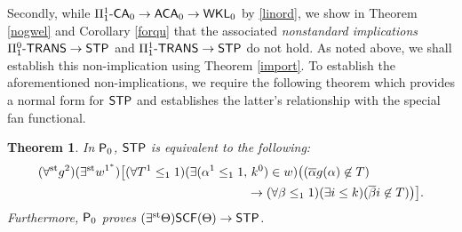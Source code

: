 \documentclass[reqno]{amsart}
\newtheorem{thm}{Theorem}
\def\FIVE{\Pi_{1}^{1}\text{-\textsf{CA}}_{0}}
\def\STP{\textup{\textsf{STP}}}
\def\WKL{\textup{\textsf{WKL}}}
\def\P{\textup{\textsf{P}}}
\def\st{\textup{st}}
\def\di{\rightarrow}
\def\ACA{\textup{\textsf{ACA}}}
\def\paai{\Pi_{1}^{0}\textup{-\textsf{TRANS}}}
\def\Paai{\Pi_{1}^{1}\textup{-\textsf{TRANS}}}
\def\SCF{\textup{\textsf{SCF}}}
\numberwithin{equation}{section}
\numberwithin{thm}{section}
\begin{document}
Secondly, while $\FIVE\di \ACA_{0}\di \WKL_{0}$ by \eqref{linord},
we show in Theorem \ref{nogwel} and Corollary \ref{forqu} that the associated \emph{nonstandard implications} $\paai\di \STP$ and $\Paai\di \STP$ do not hold.  As noted above, we shall establish this non-implication using Theorem \ref{import}.  
To establish the aforementioned non-implications, we require the following theorem which provides a normal form for $\STP$ and establishes the latter's relationship with the special fan functional.  %
\begin{thm}\label{lapdog}
In $\P_{0}$, $\STP$ is equivalent to the following:
\begin{align}\label{frukkklk}
(\forall^{\st}g^{2})(\exists^{\st}w^{1^{*}})\big[(\forall T^{1}\leq_{1}1)(\exists ( \alpha^{1}\leq_{1}1,  &~k^{0}) \in w)\big((\overline{\alpha}g(\alpha)\not\in T)\\
&\di(\forall \beta\leq_{1}1)(\exists i\leq k)(\overline{\beta}i\not\in T) \big)\big]. \notag
\end{align}  
Furthermore, $\P_{0}$ proves $(\exists^{\st}\Theta)\SCF(\Theta)\di \STP$.
\end{thm}
\end{document}

